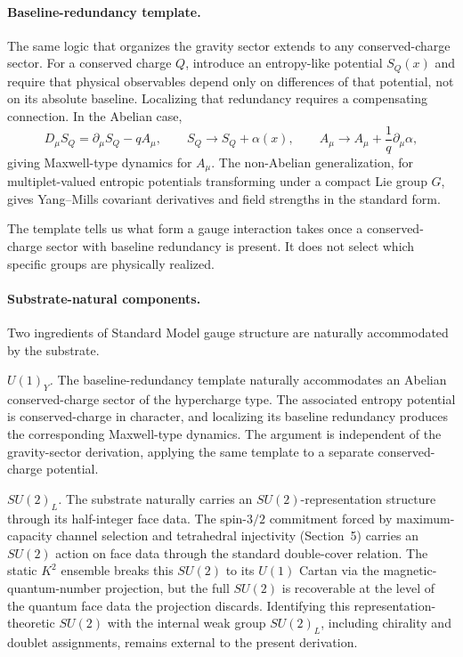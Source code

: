 \documentclass[11pt]{article}
\begin{document}
\paragraph{Baseline-redundancy template.}
The same logic that organizes the gravity sector extends to any conserved-charge sector. For a conserved charge $Q$, introduce an entropy-like potential $S_Q(x)$ and require that physical observables depend only on differences of that potential, not on its absolute baseline. Localizing that redundancy requires a compensating connection. In the Abelian case,
\[
D_\mu S_Q=\partial_\mu S_Q-qA_\mu,
\qquad
S_Q\to S_Q+\alpha(x),
\qquad
A_\mu\to A_\mu+\frac{1}{q}\partial_\mu\alpha,
\]
giving Maxwell-type dynamics for $A_\mu$. The non-Abelian generalization, for multiplet-valued entropic potentials transforming under a compact Lie group $G$, gives Yang--Mills covariant derivatives and field strengths in the standard form.

The template tells us what form a gauge interaction takes once a conserved-charge sector with baseline redundancy is present. It does not select which specific groups are physically realized.

\paragraph{Substrate-natural components.}
Two ingredients of Standard Model gauge structure are naturally accommodated by the substrate.

\emph{$U(1)_Y$.} The baseline-redundancy template naturally accommodates an Abelian conserved-charge sector of the hypercharge type. The associated entropy potential is conserved-charge in character, and localizing its baseline redundancy produces the corresponding Maxwell-type dynamics. The argument is independent of the gravity-sector derivation, applying the same template to a separate conserved-charge potential.

\emph{$SU(2)_L$.} The substrate naturally carries an $SU(2)$-representation structure through its half-integer face data. The spin-$3/2$ commitment forced by maximum-capacity channel selection and tetrahedral injectivity (Section~5) carries an $SU(2)$ action on face data through the standard double-cover relation. The static $K^2$ ensemble breaks this $SU(2)$ to its $U(1)$ Cartan via the magnetic-quantum-number projection, but the full $SU(2)$ is recoverable at the level of the quantum face data the projection discards. Identifying this representation-theoretic $SU(2)$ with the internal weak group $SU(2)_L$, including chirality and doublet assignments, remains external to the present derivation.
\end{document}
